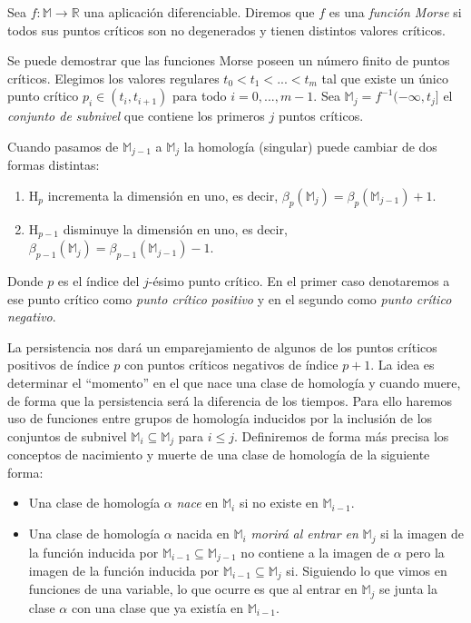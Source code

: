 \begin{definition}
Sea $f: \mathbb{M} \to \mathbb{R}$ una aplicación diferenciable. Diremos que $f$ es una \emph{función Morse} si todos sus puntos críticos son no degenerados y tienen distintos valores críticos.
\end{definition}

\begin{sloppypar}
Se puede demostrar que las funciones Morse poseen un número finito de puntos críticos. Elegimos los valores regulares $t_0 < t_1 < ... < t_m$ tal que existe un único punto crítico ${p_i \in (t_i, t_{i+1})}$ para todo $i = 0, ..., m-1$. Sea $\mathbb{M}_j=f^{-1}(-\infty, t_j]$ el \emph{conjunto de subnivel} que contiene los primeros $j$ puntos críticos.
\end{sloppypar}

Cuando pasamos de $\mathbb{M}_{j-1}$ a $\mathbb{M}_j$ la homología (singular) puede cambiar de dos formas distintas:
\begin{enumerate}[label=\Alph*)]
	\item $\text{H}_p$ incrementa la dimensión en uno, es decir, ${\beta_p(\mathbb{M}_j)} = \beta_p(\mathbb{M}_{j-1}) + 1$.
	\item $\text{H}_{p-1}$ disminuye la dimensión en uno, es decir, ${\beta_{p-1}(\mathbb{M}_j)} = \beta_{p-1}(\mathbb{M}_{j-1}) - 1$.
\end{enumerate}
Donde $p$ es el índice del $j$-ésimo punto crítico. En el primer caso denotaremos a ese punto crítico como \emph{punto crítico positivo} y en el segundo como \emph{punto crítico negativo}.

La persistencia nos dará un emparejamiento de algunos de los puntos críticos positivos de índice $p$ con puntos críticos negativos de índice $p+1$. La idea es determinar el ``momento'' en el que nace una clase de homología y cuando muere, de forma que la persistencia será la diferencia de los tiempos. Para ello haremos uso de funciones entre grupos de homología inducidos por la inclusión de los conjuntos de subnivel $\mathbb{M}_i \subseteq \mathbb{M}_j$ para $i \leq j$. Definiremos de forma más precisa los conceptos de nacimiento y muerte de una clase de homología de la siguiente forma:

\begin{itemize}
	\item Una clase de homología $\alpha$ \emph{nace} en $\mathbb{M}_i$ si no existe en $\mathbb{M}_{i-1}$.
	\item Una clase de homología $\alpha$ nacida en $\mathbb{M}_i$ \emph{morirá al entrar en} $\mathbb{M}_j$ si la imagen de la función inducida por $\mathbb{M}_{i-1} \subseteq \mathbb{M}_{j-1}$ no contiene a la imagen de $\alpha$ pero la imagen de la función inducida por $\mathbb{M}_{i-1} \subseteq \mathbb{M}_j$ si. Siguiendo lo que vimos en funciones de una variable, lo que ocurre es que al entrar en $\mathbb{M}_j$ se junta la clase $\alpha$ con una clase que ya existía en $\mathbb{M}_{i-1}$.
\end{itemize}

